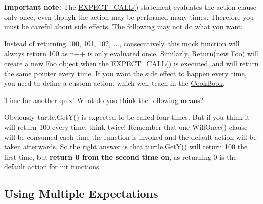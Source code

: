 {\bfseries{Important note\+:}} The {\ttfamily \mbox{\hyperlink{googletest-master_2googlemock_2include_2gmock_2gmock-spec-builders_8h_a535a6156de72c1a2e25a127e38ee5232}{E\+X\+P\+E\+C\+T\+\_\+\+C\+A\+L\+L()}}} statement evaluates the action clause only once, even though the action may be performed many times. Therefore you must be careful about side effects. The following may not do what you want\+:


\begin{DoxyCode}{0}
\end{DoxyCode}


Instead of returning 100, 101, 102, ..., consecutively, this mock function will always return 100 as {\ttfamily n++} is only evaluated once. Similarly, {\ttfamily Return(new Foo)} will create a new {\ttfamily Foo} object when the {\ttfamily \mbox{\hyperlink{googletest-master_2googlemock_2include_2gmock_2gmock-spec-builders_8h_a535a6156de72c1a2e25a127e38ee5232}{E\+X\+P\+E\+C\+T\+\_\+\+C\+A\+L\+L()}}} is executed, and will return the same pointer every time. If you want the side effect to happen every time, you need to define a custom action, which we\textquotesingle{}ll teach in the \mbox{\hyperlink{_obj__test_2lib_2googletest-release-1_88_81_2googlemock_2docs_2_cook_book_8md}{Cook\+Book}}.

Time for another quiz! What do you think the following means?


\begin{DoxyCode}{0}
\end{DoxyCode}


Obviously {\ttfamily turtle.\+Get\+Y()} is expected to be called four times. But if you think it will return 100 every time, think twice! Remember that one {\ttfamily Will\+Once()} clause will be consumed each time the function is invoked and the default action will be taken afterwards. So the right answer is that {\ttfamily turtle.\+Get\+Y()} will return 100 the first time, but {\bfseries{return 0 from the second time on}}, as returning 0 is the default action for {\ttfamily int} functions.

\subsection*{Using Multiple Expectations}

